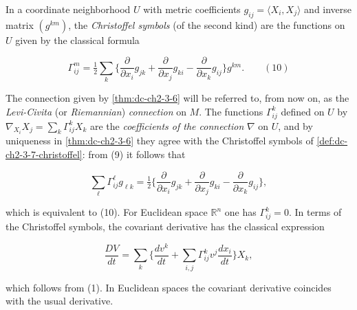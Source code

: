 \begin{definition}
  \label{def:dc-ch2-3-7-christoffel}
  \leanok
  In a coordinate neighborhood $U$ with metric coefficients
  $g_{ij}=\langle X_i,X_j\rangle$ and inverse matrix $(g^{km})$, the
  \emph{Christoffel symbols} (of the second kind) are the functions on $U$ given
  by the classical formula

  $$
  \Gamma_{ij}^m=\tfrac{1}{2}\sum_k\Big\{\frac{\partial}{\partial x_i}g_{jk}+\frac{\partial}{\partial x_j}g_{ki}-\frac{\partial}{\partial x_k}g_{ij}\Big\}g^{km}.\qquad(10)
  $$
\end{definition}

\begin{remark}
  \label{rem:dc-ch2-3-7}
  The connection given by \cref{thm:dc-ch2-3-6} will be referred to, from now on, as the
  \emph{Levi-Civita} (or \emph{Riemannian}) \emph{connection} on $M$. The functions $\Gamma_{ij}^k$
  defined on $U$ by $\nabla_{X_i}X_j=\sum_k\Gamma_{ij}^k X_k$ are the
  \emph{coefficients of the connection} $\nabla$ on $U$, and by uniqueness in
  \cref{thm:dc-ch2-3-6} they agree with the Christoffel symbols of
  \cref{def:dc-ch2-3-7-christoffel}: from (9) it follows that

  $$
  \sum_\ell\Gamma_{ij}^\ell g_{\ell k}=\tfrac{1}{2}\Big\{\frac{\partial}{\partial x_i}g_{jk}+\frac{\partial}{\partial x_j}g_{ki}-\frac{\partial}{\partial x_k}g_{ij}\Big\},
  $$

  which is equivalent to (10). For Euclidean space $\mathbb{R}^n$ one has
  $\Gamma_{ij}^k=0$. In terms of the Christoffel symbols, the covariant derivative
  has the classical expression

  $$
  \frac{DV}{dt}=\sum_k\Big\{\frac{dv^k}{dt}+\sum_{i,j}\Gamma_{ij}^k v^j\frac{dx_i}{dt}\Big\}X_k,
  $$

  which follows from (1). In Euclidean spaces the covariant derivative coincides
  with the usual derivative.
\end{remark}
